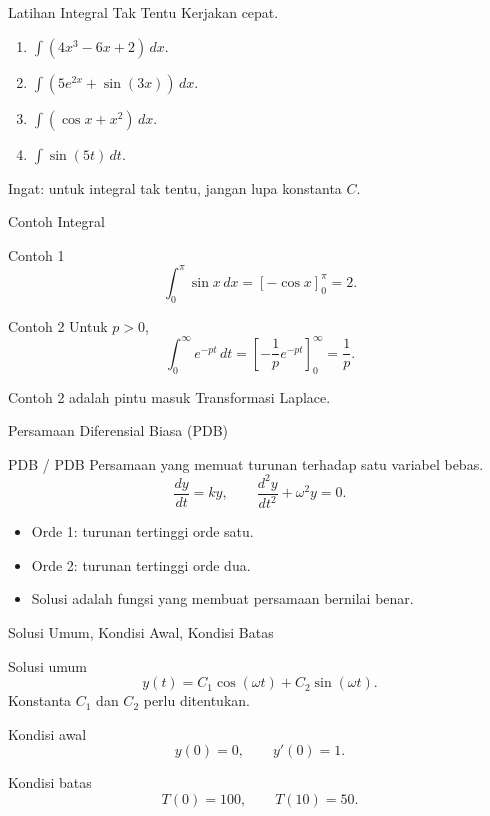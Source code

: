 \documentclass[aspectratio=169,11pt]{beamer}
\begin{document}
\begin{frame}{Latihan Integral Tak Tentu}
Kerjakan cepat.
\begin{enumerate}
  \item $\displaystyle \int (4x^3-6x+2)\,dx$.
  \item $\displaystyle \int \left(5e^{2x}+\sin(3x)\right)\,dx$.
  \item $\displaystyle \int (\cos x+x^2)\,dx$.
  \item $\displaystyle \int \sin(5t)\,dt$.
\end{enumerate}
Ingat: untuk integral tak tentu, jangan lupa konstanta $C$.
\end{frame}

\begin{frame}{Contoh Integral}
\begin{exampleblock}{Contoh 1}
\[
\int_0^\pi \sin x\,dx = [-\cos x]_0^\pi=2.
\]
\end{exampleblock}
\begin{exampleblock}{Contoh 2}
Untuk $p>0$,
\[
\int_0^\infty e^{-pt}\,dt
=\left[-\frac{1}{p}e^{-pt}\right]_0^\infty
=\frac{1}{p}.
\]
\end{exampleblock}
Contoh 2 adalah pintu masuk Transformasi Laplace.
\end{frame}

\begin{frame}{Persamaan Diferensial Biasa (PDB)}
\begin{block}{PDB / PDB}
Persamaan yang memuat turunan terhadap satu variabel bebas.
\[
\frac{dy}{dt}=ky,
\qquad
\frac{d^2y}{dt^2}+\omega^2y=0.
\]
\end{block}
\begin{itemize}
  \item Orde 1: turunan tertinggi orde satu.
  \item Orde 2: turunan tertinggi orde dua.
  \item Solusi adalah fungsi yang membuat persamaan bernilai benar.
\end{itemize}
\end{frame}

\begin{frame}{Solusi Umum, Kondisi Awal, Kondisi Batas}
\begin{block}{Solusi umum}
\[
y(t)=C_1\cos(\omega t)+C_2\sin(\omega t).
\]
Konstanta $C_1$ dan $C_2$ perlu ditentukan.
\end{block}
\begin{exampleblock}{Kondisi awal}
\[
y(0)=0,\qquad y'(0)=1.
\]
\end{exampleblock}
\begin{exampleblock}{Kondisi batas}
\[
T(0)=100,\qquad T(10)=50.
\]
\end{exampleblock}
\end{frame}
\end{document}
